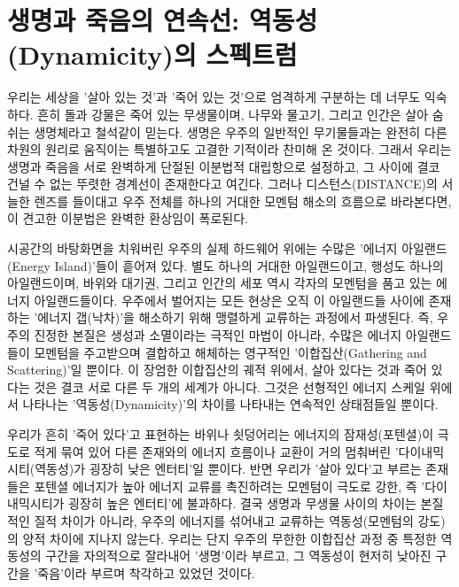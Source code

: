 

\section{생명과 죽음의 연속선: 역동성(Dynamicity)의 스펙트럼}
우리는 세상을 '살아 있는 것'과 '죽어 있는 것'으로 엄격하게 구분하는 데 너무도 익숙하다. 흔히 돌과 강물은 죽어 있는 무생물이며, 나무와 물고기, 그리고 인간은 살아 숨 쉬는 생명체라고 철석같이 믿는다. 생명은 우주의 일반적인 무기물들과는 완전히 다른 차원의 원리로 움직이는 특별하고도 고결한 기적이라 찬미해 온 것이다. 그래서 우리는 생명과 죽음을 서로 완벽하게 단절된 이분법적 대립항으로 설정하고, 그 사이에 결코 건널 수 없는 뚜렷한 경계선이 존재한다고 여긴다. 그러나 디스턴스(DISTANCE)의 서늘한 렌즈를 들이대고 우주 전체를 하나의 거대한 모멘텀 해소의 흐름으로 바라본다면, 이 견고한 이분법은 완벽한 환상임이 폭로된다.

시공간의 바탕화면을 치워버린 우주의 실제 하드웨어 위에는 수많은 '에너지 아일랜드(Energy Island)'들이 흩어져 있다. 별도 하나의 거대한 아일랜드이고, 행성도 하나의 아일랜드이며, 바위와 대기권, 그리고 인간의 세포 역시 각자의 모멘텀을 품고 있는 에너지 아일랜드들이다. 우주에서 벌어지는 모든 현상은 오직 이 아일랜드들 사이에 존재하는 '에너지 갭(낙차)'을 해소하기 위해 맹렬하게 교류하는 과정에서 파생된다. 즉, 우주의 진정한 본질은 생성과 소멸이라는 극적인 마법이 아니라, 수많은 에너지 아일랜드들이 모멘텀을 주고받으며 결합하고 해체하는 영구적인 '이합집산(Gathering and Scattering)'일 뿐이다. 이 장엄한 이합집산의 궤적 위에서, 살아 있다는 것과 죽어 있다는 것은 결코 서로 다른 두 개의 세계가 아니다. 그것은 선형적인 에너지 스케일 위에서 나타나는 '역동성(Dynamicity)'의 차이를 나타내는 연속적인 상태점들일 뿐이다.

우리가 흔히 '죽어 있다'고 표현하는 바위나 쇳덩어리는 에너지의 잠재성(포텐셜)이 극도로 적게 묶여 있어 다른 존재와의 에너지 흐름이나 교환이 거의 멈춰버린 '다이내믹시티(역동성)가 굉장히 낮은 엔터티'일 뿐이다. 반면 우리가 '살아 있다'고 부르는 존재들은 포텐셜 에너지가 높아 에너지 교류를 촉진하려는 모멘텀이 극도로 강한, 즉 '다이내믹시티가 굉장히 높은 엔터티'에 불과하다. 결국 생명과 무생물 사이의 차이는 본질적인 질적 차이가 아니라, 우주의 에너지를 섞어내고 교류하는 역동성(모멘텀의 강도)의 양적 차이에 지나지 않는다. 우리는 단지 우주의 무한한 이합집산 과정 중 특정한 역동성의 구간을 자의적으로 잘라내어 '생명'이라 부르고, 그 역동성이 현저히 낮아진 구간을 '죽음'이라 부르며 착각하고 있었던 것이다.

